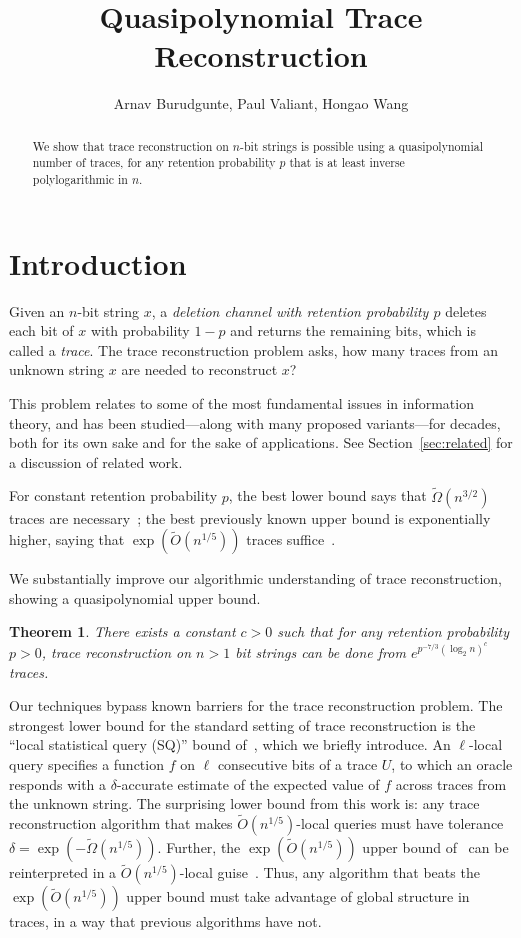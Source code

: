 \documentclass[11pt]{article}
\title{Quasipolynomial Trace Reconstruction}
\author[ ]{Arnav Burudgunte, Paul Valiant, Hongao Wang}\affil[ ]{Purdue University}
\theoremstyle{plain}
\newtheorem*{theorem*}{Theorem}
\begin{document}
\maketitle
\begin{abstract}
We show that trace reconstruction on $n$-bit strings is possible using a quasipolynomial number of traces, for any retention probability $p$ that is at least inverse polylogarithmic in $n$.
\end{abstract}
\section{Introduction}


Given an $n$-bit string $x$, a \emph{deletion channel with retention probability $p$} deletes each bit of $x$ with probability $1-p$ and returns the remaining bits, which is called a \emph{trace}. 
The trace reconstruction problem asks, how many traces from an unknown string $x$ are needed to reconstruct $x$?

This problem relates to some of the most fundamental issues in information theory, and has been studied---along with many proposed variants---for decades, both for its own sake and for the sake of applications. See Section~\ref{sec:related} for a discussion of related work.

For constant retention probability $p$, the best lower bound says that $\tilde{\Omega}(n^{3/2})$ traces are necessary~\cite{chase2021new}; the best previously known upper bound is exponentially higher, saying that $\exp(\tilde{O}(n^{1/5}))$ traces suffice~\cite{chase2021separating}.

We substantially improve our algorithmic understanding of trace reconstruction, showing a quasipolynomial upper bound.

\begin{theorem*}
There exists a constant $c>0$ such that for any retention probability $p>0$, trace reconstruction on $n>1$ bit strings can be done from $e^{p^{-7/3}(\log_2 n)^c}$ traces.
\end{theorem*}



Our techniques bypass known barriers for the trace reconstruction problem. The strongest lower bound for the standard setting of trace reconstruction is the ``local statistical query (SQ)'' bound of~\cite{chen24trace}, which we briefly introduce. An $\ell$-local query specifies a function $f$ on $\ell$ consecutive bits of a trace $U$, to which an oracle responds with a $\delta$-accurate estimate of the expected value of $f$ across traces from the unknown string. The surprising lower bound from this work is: any trace reconstruction algorithm that makes $\tilde{O}(n^{1/5})$-local queries must have tolerance $\delta = \exp(-\tilde{\Omega}(n^{1/5}))$. Further, the $\exp(\tilde{O}(n^{1/5}))$ upper bound of~\cite{chase2021separating} can be reinterpreted in a $\tilde{O}(n^{1/5})$-local guise~\cite{chen24trace}. Thus, any algorithm that beats the $\exp(\tilde{O}(n^{1/5}))$ upper bound must take advantage of global structure in traces, in a way that previous algorithms have not.
\end{document}
